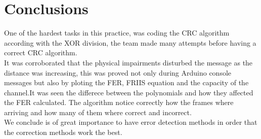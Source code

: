 \section{Conclusions}

One of the hardest tasks in this practice, was coding the CRC algorithm according with the XOR division, the team made many attempts before having a correct CRC algorithm. \\

It was corroborated that the physical impairments disturbed the message as the distance was increasing, this was proved not only  during Arduino console messages but also by ploting the FER, FRIIS equation and the capacity of the channel.It was seen the differece between the polynomials and how they affected the FER calculated.  The algorithm notice correctly how the frames where arriving and how many of them where correct and incorrect.\\

 We conclude  is of great importance to have error detection methods in order that the  correction methods work the best.